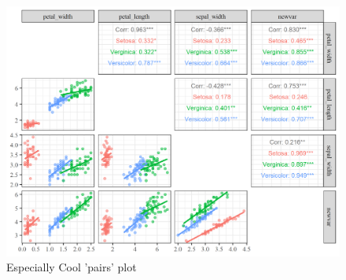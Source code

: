 \documentclass[
]{article}
\begin{document}
\begin{figure}[H]

{\centering \includegraphics[width=0.9\linewidth]{cookbook_files/figure-latex/ggpairs_plot-1} 

}

\caption{Especially Cool 'pairs' plot}\label{fig:ggpairs_plot}
\end{figure}

\FloatBarrier
\newpage

\begingroup\fontsize{7}{9}\selectfont
\end{document}
